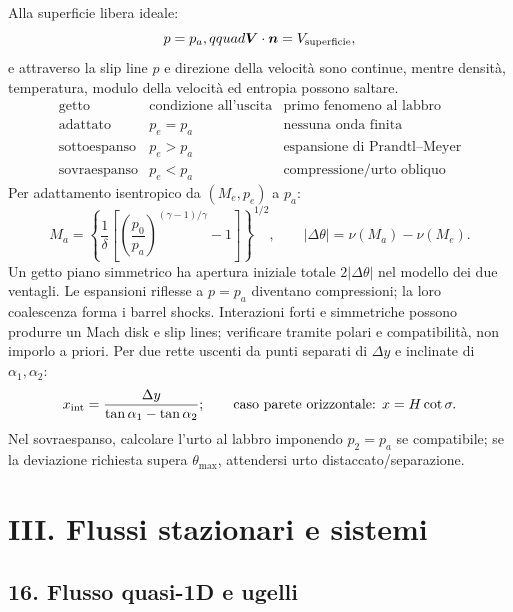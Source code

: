\documentclass[11pt,a4paper]{article}
\begin{document}
Alla superficie libera ideale:
\[
p=p_a,qquad \boldsymbol V\cdot\boldsymbol n=V_{\rm superficie},
\]
e attraverso la slip line $p$ e direzione della velocità sono continue, mentre densità,
temperatura, modulo della velocità ed entropia possono saltare.
\[
\begin{array}{c|c|c}
\text{getto}&\text{condizione all'uscita}&\text{primo fenomeno al labbro}\\ \hline
\text{adattato}&p_e=p_a&\text{nessuna onda finita}\\
\text{sottoespanso}&p_e>p_a&\text{espansione di Prandtl--Meyer}\\
\text{sovraespanso}&p_e<p_a&\text{compressione/urto obliquo}
\end{array}
\]
Per adattamento isentropico da $(M_e,p_e)$ a $p_a$:
\[
M_a=\left\{\frac1\delta\left[
\left(\frac{p_0}{p_a}\right)^{(\gamma-1)/\gamma}-1\right]\right\}^{1/2},
\qquad |\Delta\theta|=\nu(M_a)-\nu(M_e).
\]
Un getto piano simmetrico ha apertura iniziale totale $2|\Delta\theta|$ nel modello
dei due ventagli. Le espansioni riflesse a $p=p_a$ diventano compressioni; la loro
coalescenza forma i barrel shocks. Interazioni forti e simmetriche possono produrre
un Mach disk e slip lines; verificare tramite polari e compatibilità, non imporlo a priori.
Per due rette uscenti da punti separati di $\Delta y$ e inclinate di $\alpha_1,\alpha_2$:
\[
x_{\rm int}=\frac{\Delta y}{\tan\alpha_1-\tan\alpha_2};
\qquad \text{caso parete orizzontale: }x=H\cot\sigma.
\]
Nel sovraespanso, calcolare l'urto al labbro imponendo $p_2=p_a$ se compatibile; se la
deviazione richiesta supera $\theta_{\max}$, attendersi urto distaccato/separazione.

\section*{III. Flussi stazionari e sistemi}

\subsection*{16. Flusso quasi-1D e ugelli}
\end{document}
